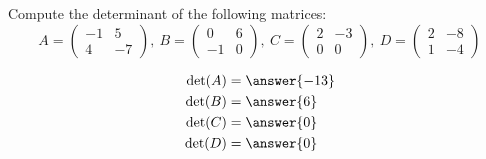 \documentclass{ximera}
\author{Parisa Fatheddin}
\begin{document}
\begin{exercise}
Compute the determinant of the following matrices:
\[
A=
\begin{pmatrix}
-1 & 5\\
4 & -7
\end{pmatrix},\  B = \begin{pmatrix} 0 & 6\\
-1 & 0
\end{pmatrix},\ C= \begin{pmatrix} 2 & -3 \\
0 & 0
\end{pmatrix},\ D = \begin{pmatrix} 2 & -8 \\
1 & -4
\end{pmatrix}
\]
\begin{prompt}
\begin{align*}
\det(A) &= \answer{-13}\\
\det(B) &= \answer{6}\\ 
\det(C) &= \answer{0}\\
\det(D) &= \answer{0}
\end{align*}
\end{prompt}
\end{exercise}
\end{document}
